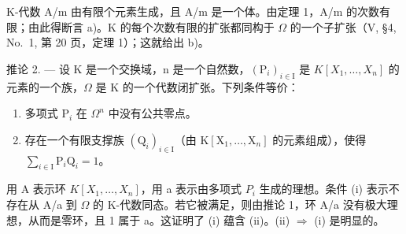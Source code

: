 K-代数 A/m 由有限个元素生成，且 A/m 是一个体。由定理 1，A/m 的次数有限；由此得断言 a)。K 的每个次数有限的扩张都同构于 \(\Omega\) 的一个子扩张（V, §4, No.~1, 第 20 页，定理 1）；这就给出 b)。

推论 2. --- 设 K 是一个交换域，n 是一个自然数，\((\mathrm{P}_{i})_{i\in\mathrm{I}}\) 是 \(K[X_{1},\ldots,X_{n}]\) 的元素的一个族，\(\Omega\) 是 K 的一个代数闭扩张。下列条件等价：

\begin{enumerate}
\def\labelenumi{(\roman{enumi})}
\item
  多项式 \(\mathrm{P}_i\) 在 \(\Omega^n\) 中没有公共零点。
\item
  存在一个有限支撑族 \((\mathrm{Q}_i)_{i\in \mathrm{I}}\)（由 \(\mathrm{K}[\mathrm{X}_1,\dots ,\mathrm{X}_n]\) 的元素组成），使得 \(\sum_{i\in \mathrm{I}}\mathrm{P}_i\mathrm{Q}_i = 1\)。
\end{enumerate}

用 A 表示环 \(K[X_{1},\ldots,X_{n}]\)，用 a 表示由多项式 \(P_{i}\) 生成的理想。条件 (i) 表示不存在从 A/a 到 \(\Omega\) 的 K-代数同态。若它被满足，则由推论 1，环 A/a 没有极大理想，从而是零环，且 1 属于 a。这证明了 (i) 蕴含 (ii)。(ii) \(\Rightarrow\) (i) 是明显的。

